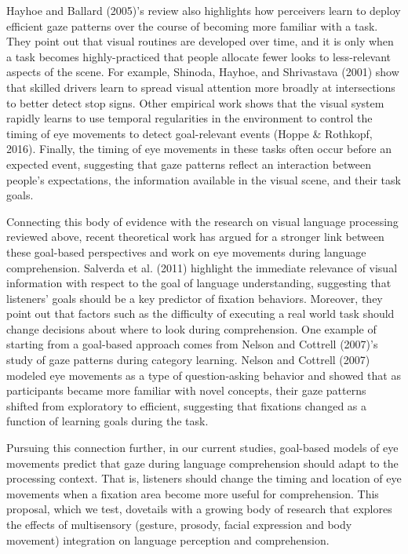 \documentclass[english,floatsintext,man]{apa6}
\begin{document}
Hayhoe and Ballard (2005)'s review also highlights how perceivers learn
to deploy efficient gaze patterns over the course of becoming more
familiar with a task. They point out that visual routines are developed
over time, and it is only when a task becomes highly-practiced that
people allocate fewer looks to less-relevant aspects of the scene. For
example, Shinoda, Hayhoe, and Shrivastava (2001) show that skilled
drivers learn to spread visual attention more broadly at intersections
to better detect stop signs. Other empirical work shows that the visual
system rapidly learns to use temporal regularities in the environment to
control the timing of eye movements to detect goal-relevant events
(Hoppe \& Rothkopf, 2016). Finally, the timing of eye movements in these
tasks often occur before an expected event, suggesting that gaze
patterns reflect an interaction between people's expectations, the
information available in the visual scene, and their task goals.

Connecting this body of evidence with the research on visual language
processing reviewed above, recent theoretical work has argued for a
stronger link between these goal-based perspectives and work on eye
movements during language comprehension. Salverda et al. (2011)
highlight the immediate relevance of visual information with respect to
the goal of language understanding, suggesting that listeners' goals
should be a key predictor of fixation behaviors. Moreover, they point
out that factors such as the difficulty of executing a real world task
should change decisions about where to look during comprehension. One
example of starting from a goal-based approach comes from Nelson and
Cottrell (2007)'s study of gaze patterns during category learning.
Nelson and Cottrell (2007) modeled eye movements as a type of
question-asking behavior and showed that as participants became more
familiar with novel concepts, their gaze patterns shifted from
exploratory to efficient, suggesting that fixations changed as a
function of learning goals during the task.

Pursuing this connection further, in our current studies, goal-based
models of eye movements predict that gaze during language comprehension
should adapt to the processing context. That is, listeners should change
the timing and location of eye movements when a fixation area become
more useful for comprehension. This proposal, which we test, dovetails
with a growing body of research that explores the effects of
multisensory (gesture, prosody, facial expression and body movement)
integration on language perception and comprehension.
\end{document}
